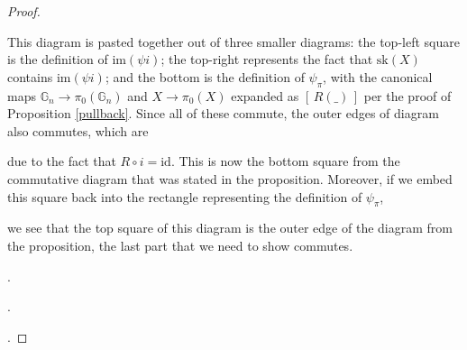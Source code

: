 \documentclass{amsart} %
\newenvironment{eq*}{\begin{equation*}}{\end{equation*}}
\begin{document}
\begin{proof}
\begin{eq*}
 \end{eq*} 
This diagram is pasted together out of three smaller diagrams: the top-left square is the definition of $\mathrm{im}(\psi i)$; the top-right represents the fact that $\mathrm{sk}(X)$ contains $\mathrm{im}(\psi i)$; and the bottom is the definition of $\psi_\pi$, with the canonical maps $\mathbb{G}_n \to \pi_0(\mathbb{G}_n)$ and $X \to \pi_0(X)$ expanded as $[ \, R(\_) \, ]$ per the proof of Proposition \ref{pullback}. Since all of these commute, the outer edges of diagram also commutes, which are
\begin{eq*}  \end{eq*} 
due to the fact that $R \circ i = \mathrm{id}$. This is now the bottom square from the commutative diagram that was stated in the proposition. Moreover, if we embed this square back into the rectangle representing the definition of $\psi_\pi$,
\begin{eq*}  \end{eq*}
we see that the top square of this diagram is the outer edge of the diagram from the proposition, the last part that we need to show commutes. 

.

.

.


\end{proof}
\end{document}
